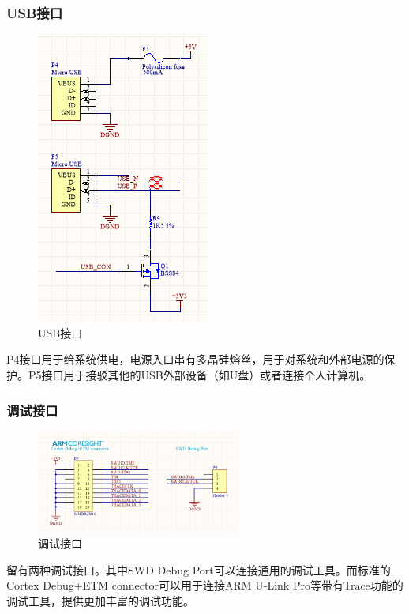 \documentclass[16pt,a4paper]{article}
\begin{document}
\subsubsection{USB接口}
\begin{figure}[H]
\centering
\includegraphics[scale = 1]{USB.png}
\caption{USB接口} 
\end{figure}

P4接口用于给系统供电，电源入口串有多晶硅熔丝，用于对系统和外部电源的保护。P5接口用于接驳其他的USB外部设备（如U盘）或者连接个人计算机。

\subsubsection{调试接口}
\begin{figure}[H]
\centering
\includegraphics[width=0.6\textwidth]{debug.png}
\caption{调试接口} 
\end{figure}
留有两种调试接口。其中SWD Debug Port可以连接通用的调试工具。而标准的Cortex Debug+ETM connector可以用于连接ARM U-Link Pro等带有Trace功能的调试工具，提供更加丰富的调试功能。
\end{document}
